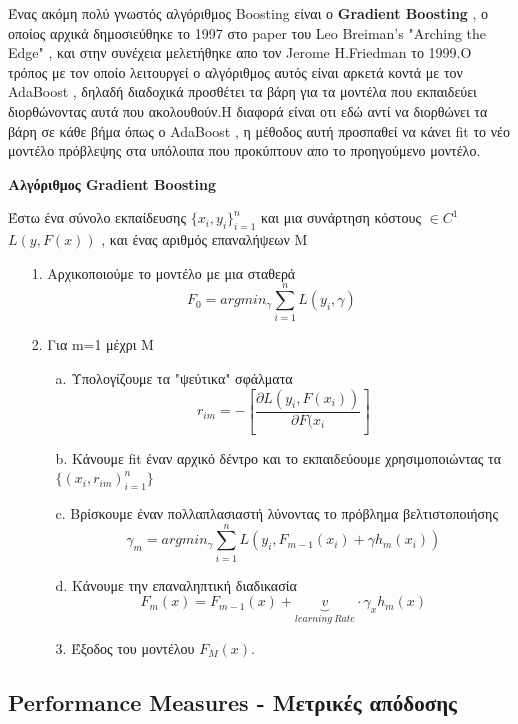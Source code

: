 \documentclass[12pt,a4paper]{article}
\begin{document}
Ένας ακόμη πολύ γνωστός αλγόριθμος Boosting είναι ο \textbf{Gradient Boosting} , ο οποίος αρχικά δημοσιεύθηκε το 1997 στο paper του Leo Breiman's "Arching the Edge"  , και στην συνέχεια μελετήθηκε απο τον Jerome H.Friedman το 1999.Ο τρόπος με τον οποίο λειτουργεί ο αλγόριθμος αυτός είναι αρκετά κοντά με τον AdaBoost , δηλαδή διαδοχικά προσθέτει τα βάρη για τα μοντέλα που εκπαιδεύει διορθώνοντας αυτά που ακολουθούν.Η διαφορά είναι οτι εδώ αντί να διορθώνει τα βάρη σε κάθε βήμα όπως ο AdaBoost , η μέθοδος αυτή προσπαθεί να κάνει fit το νέο μοντέλο πρόβλεψης στα υπόλοιπα που προκύπτουν απο το προηγούμενο μοντέλο.

\par \textbf{Αλγόριθμος Gradient Boosting}

Έστω ένα σύνολο εκπαίδευσης $\{x_i , y_i \}_{i=1}^n$ και μια συνάρτηση κόστους $\in C^1$ $L(y,F(x))$ , και ένας αριθμός επαναλήψεων M
\begin{itemize}
\item[1.] Αρχικοποιούμε το μοντέλο με μια σταθερά $$F_0 = argmin_{\gamma} \sum_{i=1}^n L(y_i, \gamma)$$

\item[2.] Για m=1 μέχρι M
\begin{itemize}
\item[a.] Υπολογίζουμε τα "ψεύτικα" σφάλματα
$$r_{im} = -[\frac{\partial L(y_i,F(x_i))}{\partial F(x_i}]$$
\item[b.] Κάνουμε fit έναν αρχικό δέντρο και το εκπαιδεύουμε χρησιμοποιώντας τα $\{(x_i, r_{im})_{i=1}^n\}$
\item[c.] Βρίσκουμε έναν πολλαπλασιαστή λύνοντας το πρόβλημα βελτιστοποιήσης
$$\gamma_m = argmin_{\gamma} \sum_{i=1}^n L(y_i,F_{m-1}(x_i) +\gamma h_m(x_i))$$
\item[d.] Κάνουμε την επαναληπτική διαδικασία
$$F_m(x) = F_{m-1}(x) +\underbrace{v}_{learning \ Rate}\cdot\gamma_x h_m(x)$$
\item[3.] Έξοδος του μοντέλου $F_M(x)$.


\end{itemize}


\end{itemize}



\newpage



\subsection{Performance Measures - Μετρικές απόδοσης}
\end{document}
